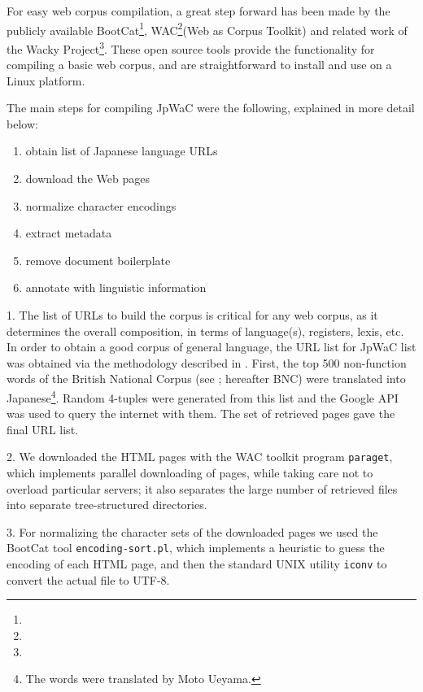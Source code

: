 \documentclass[english]{jnlp_1.4}
\newcommand{\url}[1]{}
\begin{document}
For easy web corpus compilation, a great step forward has been made by
the publicly available
BootCat\footnote{
	\url{http://sslmit.unibo.it/{\textasciitilde baroni}/bootcat.html}
},
WAC\footnote{
	\url{http://www.drni.de/wac-tk/}
}(Web as Corpus
Toolkit) and related work of the Wacky
Project\footnote{
	\url{http://wacky.sslmit.unibo.it/}
}. 
These open source tools provide the functionality
for compiling a basic web corpus, and are straightforward to install
and use on a Linux platform.

The main steps for compiling JpWaC were the following, explained in more detail below:

\begin{enumerate}
\item obtain list of Japanese language URLs 
\item download the Web pages
\item normalize character encodings
\item extract metadata
\item remove document boilerplate 
\item annotate with linguistic information
\end{enumerate}


1. The list of URLs to build the corpus is critical for any web
corpus, as it determines the overall composition, in terms of
language(s), registers, lexis, etc. In order to obtain a good corpus
of general language, the URL list for JpWaC list was obtained via the
methodology described in . First, the top 500
non-function words of the British National Corpus (see
\url{http://natcorp.ox.ac.uk}; hereafter BNC) were translated into
Japanese\footnote{
	The words were translated by Moto Ueyama.
}. Random
4-tuples were generated from this list and the Google API was used to
query the internet with them. The set of retrieved pages gave the
final URL list.

2. We downloaded the HTML pages with the WAC toolkit program {\tt paraget}, which implements parallel downloading of pages, while taking care not to overload particular servers; it also separates the large number of retrieved files into separate tree-structured directories.

3. For normalizing the character sets of the downloaded pages we used
the BootCat tool {\tt encoding-sort.pl}, which implements a heuristic
to guess the encoding of each HTML page, and then the standard UNIX
utility {\tt iconv} to convert the actual file to UTF-8.
\end{document}
